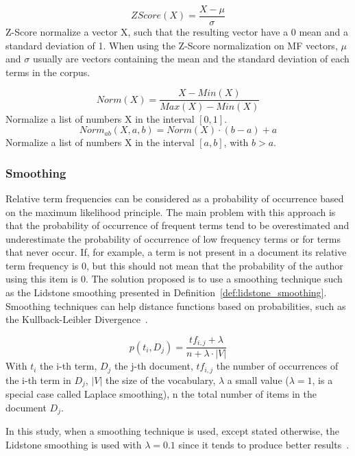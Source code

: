 \begin{definition}
  \label{def:z_score}
  \begin{equation}
    ZScore(X) = \frac{X - \mu}{\sigma}
  \end{equation}
  Z-Score normalize a vector X, such that the resulting vector have a 0 mean and a standard deviation of 1.
  When using the Z-Score normalization on MF vectors, $\mu$ and $\sigma$ usually are vectors containing the mean and the standard deviation of each terms in the corpus.
\end{definition}

\begin{definition}
  \label{def:normalization}
  \begin{equation}
    Norm(X) = \frac{X - Min(X)}{Max(X) - Min(X)}
  \end{equation}
  Normalize a list of numbers X in the interval $[0, 1]$.
  \begin{equation}
    Norm_{ab}(X, a, b) = Norm(X) \cdot (b - a) + a
  \end{equation}
  Normalize a list of numbers X in the interval $[a, b]$, with $b > a$.
\end{definition}

\subsubsection{Smoothing}

Relative term frequencies can be considered as a probability of occurrence based on the maximum likelihood principle.
The main problem with this approach is that the probability of occurrence of frequent terms tend to be overestimated and underestimate the probability of occurrence of low frequency terms or for terms that never occur.
If, for example, a term is not present in a document its relative term frequency is 0, but this should not mean that the probability of the author using this item is 0.
The solution proposed is to use a smoothing technique such as the Lidstone smoothing presented in Definition~\ref{def:lidstone_smoothing}.
Smoothing techniques can help distance functions based on probabilities, such as the Kullback-Leibler Divergence~\cite{savoy_stylo}.

\begin{definition}
  \label{def:lidstone_smoothing}
  \begin{equation}
    p(t_i, D_j) = \frac{tf_{i,j} + \lambda}{n + \lambda \cdot |V|}
  \end{equation}
  With $t_i$ the i-th term, $D_j$ the j-th document, $tf_{i,j}$ the number of occurrences of the i-th term in $D_j$, $|V|$ the size of the vocabulary, $\lambda$ a small value ($\lambda = 1$, is a special case called Laplace smoothing), n the total number of items in the document $D_j$.
\end{definition}

In this study, when a smoothing technique is used, except stated otherwise, the Lidstone smoothing is used with $\lambda = 0.1$ since it tends to produce better results~\cite{savoy_stylo}.
